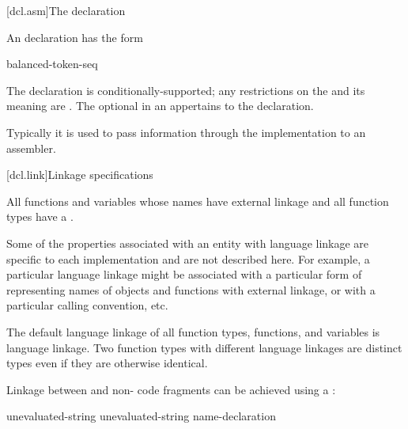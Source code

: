 
[dcl.asm]{The  declaration}%
%
%

\pnum
An  declaration has the form
\begin{bnf}
\br
      \terminal{(} balanced-token-seq \terminal{)} \terminal{;}
\end{bnf}

The  declaration is conditionally-supported;
any restrictions on the  and
its meaning are .
The optional  in
an  appertains to the  declaration.
\begin{note}
Typically it is used to pass information through the implementation to
an assembler.
\end{note}

[dcl.link]{Linkage specifications}%

\pnum
All functions and variables whose names have external linkage
and all function types
have a .
\begin{note}
Some of the properties associated with an entity with language linkage
are specific to each implementation and are not described here. For
example, a particular language linkage might be associated with a
particular form of representing names of objects and functions with
external linkage, or with a particular calling convention, etc.
\end{note}
The default language linkage of all function types, functions, and
variables is \Cpp{} language linkage. Two function types with
different language linkages are distinct types even if they are
otherwise identical.

\pnum
Linkage between \Cpp{} and  non-\Cpp{} code fragments can
be achieved using a :

%
%
%
\begin{bnf}
\br
     unevaluated-string \terminal{\{}  \terminal{\}}\br
     unevaluated-string name-declaration
\end{bnf}


